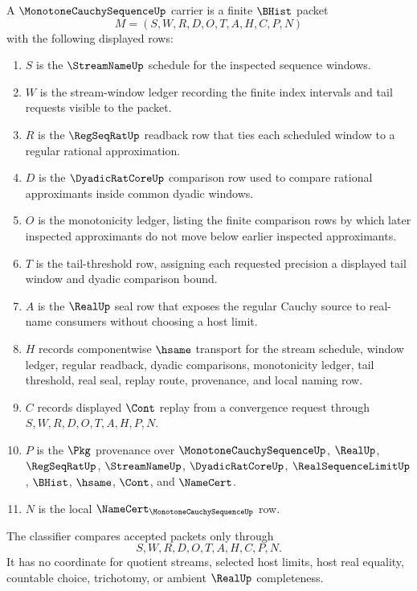 \begin{definition}
\label{def:monotone-cauchy-sequence-carrier}
A $\MonotoneCauchySequenceUp$ carrier is a finite $\BHist$ packet
$$
M=(S,W,R,D,O,T,A,H,C,P,N)
$$
with the following displayed rows:
\begin{enumerate}
\item $S$ is the $\StreamNameUp$ schedule for the inspected sequence windows.
\item $W$ is the stream-window ledger recording the finite index intervals and tail requests visible to the packet.
\item $R$ is the $\RegSeqRatUp$ readback row that ties each scheduled window to a regular rational approximation.
\item $D$ is the $\DyadicRatCoreUp$ comparison row used to compare rational approximants inside common dyadic windows.
\item $O$ is the monotonicity ledger, listing the finite comparison rows by which later inspected approximants do not move below earlier inspected approximants.
\item $T$ is the tail-threshold row, assigning each requested precision a displayed tail window and dyadic comparison bound.
\item $A$ is the $\RealUp$ seal row that exposes the regular Cauchy source to real-name consumers without choosing a host limit.
\item $H$ records componentwise $\hsame$ transport for the stream schedule, window ledger, regular readback, dyadic comparisons, monotonicity ledger, tail threshold, real seal, replay route, provenance, and local naming row.
\item $C$ records displayed $\Cont$ replay from a convergence request through $S,W,R,D,O,T,A,H,P,N$.
\item $P$ is the $\Pkg$ provenance over $\MonotoneCauchySequenceUp$, $\RealUp$, $\RegSeqRatUp$, $\StreamNameUp$, $\DyadicRatCoreUp$, $\RealSequenceLimitUp$, $\BHist$, $\hsame$, $\Cont$, and $\NameCert$.
\item $N$ is the local $\NameCert_{\MonotoneCauchySequenceUp}$ row.
\end{enumerate}
The classifier compares accepted packets only through
$$
S,W,R,D,O,T,A,H,C,P,N.
$$
It has no coordinate for quotient streams, selected host limits, host real equality, countable choice, trichotomy, or ambient $\RealUp$ completeness.
\end{definition}

